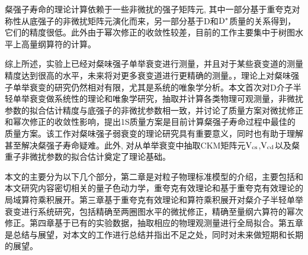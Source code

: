 粲强子寿命的理论计算依赖于一些非微扰的强子矩阵元, 其中一部分基于重夸克对称性从底强子的非微扰矩阵元演化而来，另一部分基于D和$\mathrm{D}^{*}$质量的关系得到，它们的精度很低。此外由于幂次修正的收敛性较差，目前的工作主要集中于树图水平上高量纲算符的计算\cite{Pak:2008qt, deBoer:2017way}。

综上所述，实验上已经对粲味强子单举衰变进行测量，并且对于某些衰变道的测量精度达到很高的水平，未来将对更多衰变道进行更精确的测量。，理论上对粲味强子单举衰变的研究仍然相对有限，尤其是系统的唯象学分析。本文首次对D介子半轻单举衰变做系统性的理论和唯象学研究，抽取并计算各类物理可观测量，非微扰参数的拟合估计精度与底强子的非微扰参数相一致，并讨论了质量方案对微扰修正和幂次修正的收敛性影响，提出1S质量方案是目前计算粲强子寿命过程中最佳的质量方案。该工作对粲味强子弱衰变的理论研究具有重要意义，同时也有助于理解甚至解决粲强子寿命疑难。此外, 对从单举衰变中抽取CKM矩阵元$\mathrm{V}_{\mathrm{cs}}$,$\mathrm{V}_{\mathrm{cd}}$以及粲重子非微扰参数的拟合估计奠定了理论基础。

本文的主要分为以下几个部分，第二章是对粒子物理标准模型的介绍，主要包括和本文研究内容密切相关的量子色动力学，重夸克有效理论和基于重夸克有效理论的局域算符乘积展开。第三章基于重夸克有效理论和算符乘积展开对粲介子半轻单举衰变进行系统研究，包括精确至两圈图水平的微扰修正，精确至量纲六算符的幂次修正。第四章基于已有的实验数据，抽取相应的物理观测量进行全局拟合。第五章是总结与展望，对本文的工作进行总结并指出不足之处，同时对未来做短期和长期的展望。